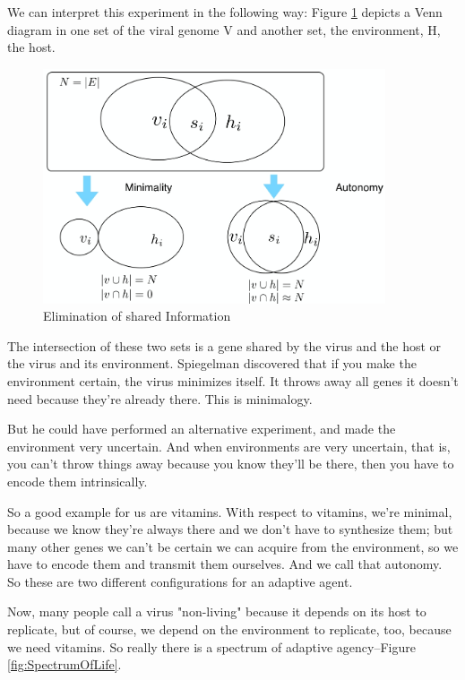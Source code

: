 \documentclass[]{article}
\begin{document}
We can interpret this experiment in the following way: Figure \ref{fig:SpiegelmanMonsterVenn} depicts a Venn diagram in one set of the viral genome V
and another set, the environment, H, the host.

\begin{figure}[H]
	\caption{Elimination of shared Information}\label{fig:SpiegelmanMonsterVenn}
	\includegraphics[width=0.9\textwidth]{SpiegelmanMonsterVenn}
\end{figure}
The intersection of these two sets is a gene shared by the virus and the host
or the virus and its environment. 
Spiegelman discovered that if you make the environment certain, the virus minimizes itself.
It throws away all genes it doesn't need because they're already there. This is minimalogy.

But he could have performed an alternative experiment, and made the environment very uncertain.
And when environments are very uncertain, that is, you can't throw things away because you know they'll be there, then you have to encode them intrinsically.

So a good example for us are vitamins.
With respect to vitamins, we're minimal, because we know they're always there and we don't have to synthesize them; but many other genes we can't be certain we can acquire
from the environment, so we have to encode them and transmit them ourselves. And we call that autonomy. So these are two different configurations for an adaptive agent.

Now, many people call a virus "non-living"
because it depends on its host
to replicate, but of course,
we depend on the environment to replicate,
too, because we need vitamins.
So really there is a spectrum of
adaptive agency--Figure \ref{fig:SpectrumOfLife}.
\end{document}

